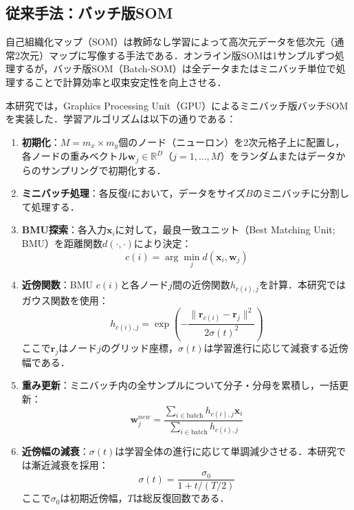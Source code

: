 \documentclass{jarticle}
\theoremstyle{definition}
\begin{document}
\subsection{従来手法：バッチ版SOM}
自己組織化マップ（SOM）\cite{kohonen1990self}は教師なし学習によって高次元データを低次元（通常2次元）マップに写像する手法である．オンライン版SOMは1サンプルずつ処理するが，バッチ版SOM（Batch-SOM）\cite{kohonen1995batch}は全データまたはミニバッチ単位で処理することで計算効率と収束安定性を向上させる．

本研究では，Graphics Processing Unit（GPU）によるミニバッチ版バッチSOMを実装した．学習アルゴリズムは以下の通りである：

\begin{enumerate}
\item \textbf{初期化}：$M = m_x \times m_y$個のノード（ニューロン）を2次元格子上に配置し，各ノードの重みベクトル$\bm{w}_j \in \mathbb{R}^D$（$j=1,...,M$）をランダムまたはデータからのサンプリングで初期化する．
\item \textbf{ミニバッチ処理}：各反復$t$において，データをサイズ$B$のミニバッチに分割して処理する．
\item \textbf{BMU探索}：各入力$\bm{x}_i$に対して，最良一致ユニット（Best Matching Unit; BMU）を距離関数$d(\cdot, \cdot)$により決定：
\begin{equation}
c(i) = \arg\min_{j} d(\bm{x}_i, \bm{w}_j)
\end{equation}
\item \textbf{近傍関数}：BMU $c(i)$と各ノード$j$間の近傍関数$h_{c(i),j}$を計算．本研究ではガウス関数を使用：
\begin{equation}
h_{c(i),j} = \exp\left(-\frac{\|\bm{r}_{c(i)} - \bm{r}_j\|^2}{2\sigma(t)^2}\right)
\end{equation}
ここで$\bm{r}_j$はノード$j$のグリッド座標，$\sigma(t)$は学習進行に応じて減衰する近傍幅である．
\item \textbf{重み更新}：ミニバッチ内の全サンプルについて分子・分母を累積し，一括更新：
\begin{equation}
\bm{w}_j^{new} = \frac{\sum_{i \in \text{batch}} h_{c(i),j} \bm{x}_i}{\sum_{i \in \text{batch}} h_{c(i),j}}
\end{equation}
\item \textbf{近傍幅の減衰}：$\sigma(t)$は学習全体の進行に応じて単調減少させる．本研究では漸近減衰を採用：
\begin{equation}
\sigma(t) = \frac{\sigma_0}{1 + t/(T/2)}
\end{equation}
ここで$\sigma_0$は初期近傍幅，$T$は総反復回数である．
\end{enumerate}
\end{document}
